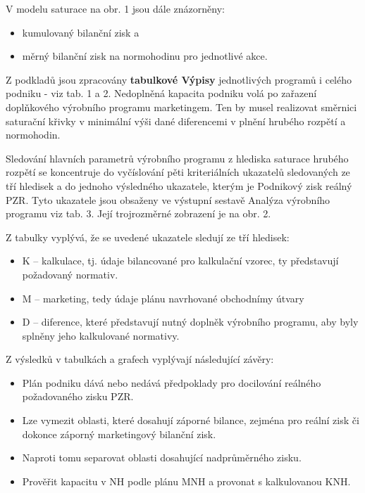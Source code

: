 \documentclass [10pt, fancyhdr, twoside] {article}
\begin{document}
V modelu saturace na obr. 1 jsou dále znázorněny:

\begin{itemize}
\item kumulovaný bilanční zisk a
\item měrný bilanční zisk na normohodinu pro jednotlivé akce.
\end{itemize}

Z podkladů jsou zpracovány \textbf{tabulkové Výpisy} jednotlivých programů i celého podniku - viz tab. 1 a 2. Nedoplněná kapacita podniku volá po zařazení doplňkového výrobního programu marketingem. Ten by musel realizovat směrnici saturační křivky v minimální výši dané diferencemi v plnění hrubého rozpětí a normohodin.

Sledování hlavních parametrů výrobního programu z hlediska saturace hrubého rozpětí se koncentruje do vyčíslování pěti kriteriálních ukazatelů sledovaných ze tří hledisek a do jednoho výsledného ukazatele, kterým je Podnikový zisk reálný PZR. Tyto ukazatele jsou obsaženy ve výstupní sestavě Analýza výrobního programu viz tab. 3. Její trojrozměrné zobrazení je na obr. 2.

Z tabulky vyplývá, že se uvedené ukazatele sledují ze tří hledisek:

\begin{itemize}
\item K – kalkulace, tj. údaje bilancované pro kalkulační vzorec, ty představují požadovaný normativ.
\item M – marketing, tedy údaje plánu navrhované obchodnímy útvary
\item D – diference, které představují nutný doplněk výrobního programu, aby byly splněny jeho kalkulované normativy.
\end{itemize}

Z výsledků v tabulkách a grafech vyplývají následující závěry:

\begin{itemize}
\item Plán podniku dává nebo nedává předpoklady pro docilování reálného požadovaného zisku PZR.
\item Lze vymezit oblasti, které dosahují záporné bilance, zejména pro reální zisk či dokonce záporný marketingový bilanční zisk.
\item Naproti tomu separovat oblasti dosahující nadprůměrného zisku.
\item Prověřit kapacitu v NH podle plánu MNH a provonat s kalkulovanou KNH.
\end{itemize}
\end{document}
